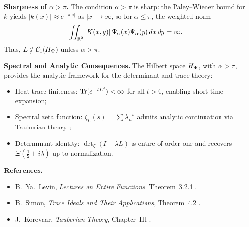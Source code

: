\begin{definition}
\medskip
\noindent\textbf{Sharpness of \( \alpha > \pi \).}
The condition \( \alpha > \pi \) is sharp: the Paley--Wiener bound for \( k \) yields \( |k(x)| \approx e^{-\pi|x|} \) as \( |x| \to \infty \), so for \( \alpha \le \pi \), the weighted norm
\[
\iint_{\mathbb{R}^2} |K(x,y)| \, \Psi_\alpha(x)\Psi_\alpha(y)\, dx\,dy = \infty.
\]
Thus, \( L \notin \mathcal{C}_1(H_{\Psi}) \) unless \( \alpha > \pi \).

\medskip
\noindent\textbf{Spectral and Analytic Consequences.}
The Hilbert space \( H_{\Psi} \), with \( \alpha > \pi \), provides the analytic framework for the determinant and trace theory:
\begin{itemize}
    \item Heat trace finiteness: \( \operatorname{Tr}(e^{-tL^2}) < \infty \) for all \( t > 0 \), enabling short-time expansion;
    \item Spectral zeta function: \( \zeta_L(s) = \sum \lambda_n^{-s} \) admits analytic continuation via Tauberian theory \cite{Korevaar2004Tauberian};
    \item Determinant identity: \( \det\nolimits_\zeta(I - \lambda L) \) is entire of order one and recovers \( \Xi(\tfrac{1}{2} + i\lambda) \) up to normalization.
\end{itemize}

\medskip
\noindent\textbf{References.}
\begin{itemize}
    \item B.~Ya.~Levin, \emph{Lectures on Entire Functions}, Theorem~3.2.4 \cite{Levin1996EntireLectures}.
    \item B.~Simon, \emph{Trace Ideals and Their Applications}, Theorem~4.2 \cite{Simon2005TraceIdeals}.
    \item J.~Korevaar, \emph{Tauberian Theory}, Chapter~III \cite{Korevaar2004Tauberian}.
\end{itemize}
\end{definition}
